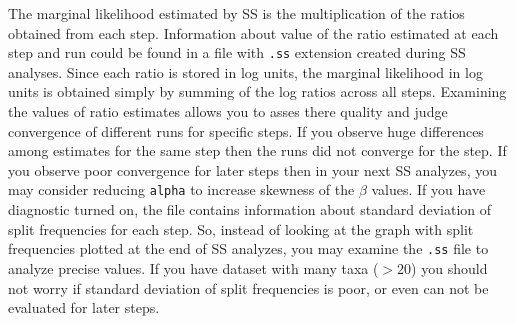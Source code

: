 \documentclass[12pt]{book}
\newcommand{\ttt}[1]{\texttt{#1}}
\begin{document}
The marginal likelihood estimated by SS is the multiplication of the ratios obtained from each
step. Information about value of the ratio estimated at each step and run could be found in a file
with \ttt{.ss} extension created during SS analyses. Since each ratio is stored in log units, the
marginal likelihood in log units is obtained simply by summing of the log ratios across all steps.
Examining the values of ratio estimates allows you to asses there quality and judge convergence of
different runs for specific steps. If you observe huge differences among estimates for the same
step then the runs did not converge for the step. If you observe poor convergence for later steps
then in your next SS analyzes, you may consider reducing \ttt{alpha} to increase skewness of the
$\beta$ values. If you have diagnostic turned on, the file contains information about standard
deviation of split frequencies for each step. So, instead of looking at the graph with split
frequencies plotted at the end of SS analyzes, you may examine the \ttt{.ss} file to analyze
precise values. If you have dataset with many taxa ($>20$) you should not worry if standard
deviation of split frequencies is poor, or even can not be evaluated for later steps.

\end{document}
